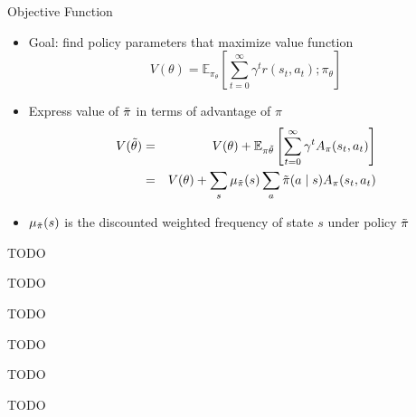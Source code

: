 \documentclass[aspectratio=169]{../latex_main/tntbeamer}  %
\begin{document}
\begin{frame}[c]{Objective Function}
	
    \begin{itemize}
        \item Goal: find policy parameters that maximize value function
        $$ V(\theta) = \mathbb{E}_{\pi_\theta} \left[ \sum_{t=0}^{\infty} \gamma^t r(s_t, a_t); \pi_\theta \right]$$
        \item Express value of $\Tilde{\pi}$ in terms of advantage of $\pi$
        \begin{eqnarray}
        V(\Tilde{\theta}) &=& V(\theta) + \mathbb{E}_{\pi{\Tilde{\theta}}} \left[ \sum_{t=0}^{\infty} \gamma^t A_\pi(s_t, a_t) \right]\\
        &=& V(\theta) + \sum_{s} \mu_{\Tilde{\pi}}(s) \sum_{a} \Tilde{\pi}(a \mid s) A_\pi(s_t, a_t) 
        \end{eqnarray}
        \item $ \mu_{\Tilde{\pi}}(s)$ is the discounted weighted frequency of state $s$ under policy $\Tilde{\pi}$
    \end{itemize}

\end{frame}
\begin{frame}[c]{TODO}
	
    TODO	

\end{frame}
\begin{frame}[c]{TODO}
	
    TODO	

\end{frame}
\begin{frame}[c]{TODO}
	
    TODO	

\end{frame}

\end{document}
